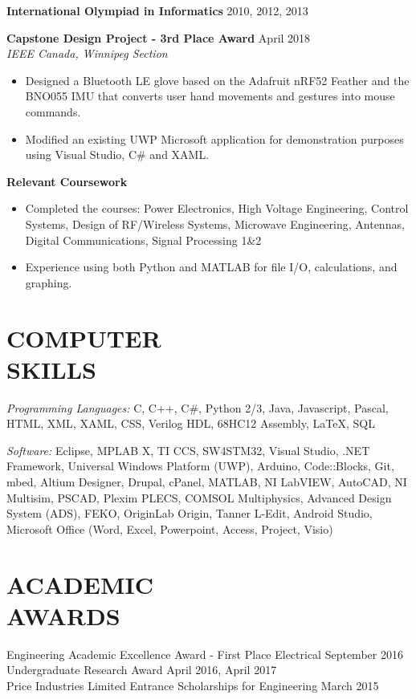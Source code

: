 \documentclass[margin]{res}
\begin{document}
\begin{resume}
\begin{itemize}
\end{itemize}

{\bf International Olympiad in Informatics} \hfill 2010, 2012, 2013

{\bf Capstone Design Project - 3rd Place Award} \hfill April 2018 \\
{\sl IEEE Canada, Winnipeg Section}
\begin{itemize}  \itemsep -0pt 
	\item Designed a Bluetooth LE glove based on the Adafruit nRF52 Feather and the BNO055 IMU that converts user hand movements and gestures into mouse commands.
	\item Modified an existing UWP Microsoft application for demonstration purposes using Visual Studio, C\# and XAML.
\end{itemize}

{\bf Relevant Coursework}
\begin{itemize}  \itemsep -0pt 
	\item Completed the courses: Power Electronics, High Voltage Engineering, Control Systems, Design of RF/Wireless Systems, Microwave Engineering, Antennas, Digital Communications, Signal Processing 1\&2
	\item Experience using both Python and MATLAB for file I/O, calculations, and graphing.
\end{itemize}
	
\section{COMPUTER \\ SKILLS} 
{\sl Programming Languages:} C, C++, C\#, Python 2/3, Java, Javascript, Pascal, HTML, XML, XAML, CSS, Verilog HDL, 68HC12 Assembly, LaTeX, SQL

{\sl Software:} Eclipse, MPLAB X, TI CCS, SW4STM32, Visual Studio, .NET Framework, Universal Windows Platform (UWP), Arduino, Code::Blocks, Git,  mbed, Altium Designer, Drupal, cPanel, MATLAB, NI LabVIEW, AutoCAD, NI Multisim, PSCAD, Plexim PLECS, COMSOL Multiphysics, Advanced Design System (ADS), FEKO, OriginLab Origin, Tanner L-Edit, Android Studio, Microsoft Office (Word, Excel, Powerpoint, Access, Project, Visio)

\section{ACADEMIC \\ AWARDS} 
Engineering Academic Excellence Award - First Place Electrical \hfill September 2016 \\
Undergraduate Research Award \hfill April 2016, April 2017 \\
Price Industries Limited Entrance Scholarships for Engineering \hfill March 2015 
           

\end{resume}
\end{document}
